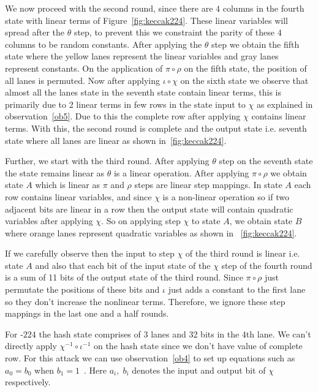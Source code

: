 We now proceed with the second round, since there are $4$ columns in the fourth state with linear terms of Figure~\ref{fig:keccak224}. These linear variables will spread after the $\theta$ step, to prevent this we constraint the parity of these $4$ columns to be random constants. After applying the $\theta$ step we obtain the fifth state where the yellow lanes represent the linear variables and gray lanes represent constants. On the application of $\pi \circ \rho$ on the fifth state, the position of all lanes is permuted. Now after applying $\iota \circ \chi$ on the sixth state we observe that almost all the lanes state in the seventh state contain linear terms, this is primarily due to 2 linear terms in few rows in the state input to $\chi$ as explained in observation~\ref{ob5}. Due to this the complete row after applying $\chi$ contains linear terms. With this, the second round is complete and the output state i.e. seventh state where all lanes are linear as shown in~\ref{fig:keccak224}.

Further, we start with the third round. After applying $\theta$ step on the seventh state the state remains linear as $\theta$ is a linear operation. After applying $\pi \circ \rho$ we obtain state $A$ which is linear as $\pi$ and $\rho$ steps are linear step mappings. In state $A$ each row contains linear variables, and since $\chi$ is a non-linear operation so if two adjacent bits are linear in a row then the output state will contain quadratic variables after applying $\chi$. So on applying step $\chi$ to state $A$, we obtain state $B$ where orange lanes represent quadratic variables as shown in ~\ref{fig:keccak224}.

If we carefully observe then the input to step $\chi$ of the third round is linear i.e. state $A$ and also that each bit of the input state of the $\chi$ step of the fourth round is a sum of 11 bits of the output state of the third round. Since $\pi \circ \rho$ just permutate the positions of these bits and $\iota$ just adds a constant to the first lane so they don't increase the nonlinear terms. Therefore, we ignore these step mappings in the last one and a half rounds.

For \Keccak{}-$224$ the hash state comprises of 3 lanes and 32 bits in the 4th lane. We can't directly apply $\chi^{-1} \circ \iota^{-1}$ on the hash state since we don't have value of complete row. For this attack we can use observation~\ref{ob4} to set up equations such as $a_0 = b_0$ when $b_1 = 1$~\cite{guo2016linear}. Here $a_i, \; b_i$ denotes the input and output bit of $\chi$ respectively.

